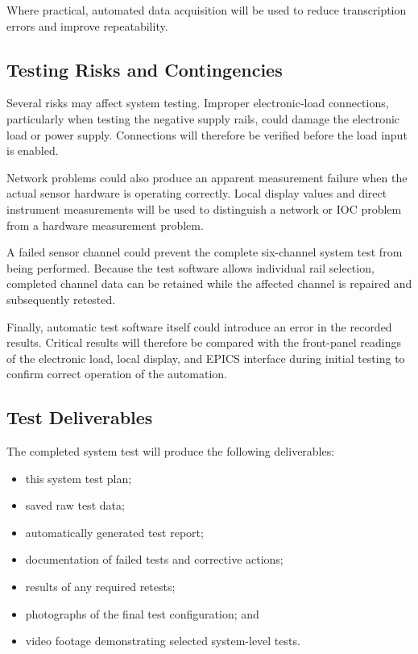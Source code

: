 Where practical, automated data acquisition will be used to reduce transcription
errors and improve repeatability.

\subsection{Testing Risks and Contingencies}

Several risks may affect system testing. Improper electronic-load connections,
particularly when testing the negative supply rails, could damage the electronic
load or power supply. Connections will therefore be verified before the load input
is enabled.

Network problems could also produce an apparent measurement failure when the actual
sensor hardware is operating correctly. Local display values and direct instrument
measurements will be used to distinguish a network or IOC problem from a hardware
measurement problem.

A failed sensor channel could prevent the complete six-channel system test from
being performed. Because the test software allows individual rail selection, completed
channel data can be retained while the affected channel is repaired and subsequently
retested.

Finally, automatic test software itself could introduce an error in the recorded
results. Critical results will therefore be compared with the front-panel readings
of the electronic load, local display, and EPICS interface during
initial testing to confirm correct operation of the automation.

\subsection{Test Deliverables}

The completed system test will produce the following deliverables:

\begin{itemize}
    \item this system test plan;
    \item saved raw test data;
    \item automatically generated test report;
    \item documentation of failed tests and corrective actions;
    \item results of any required retests;
    \item photographs of the final test configuration; and
    \item video footage demonstrating selected system-level tests.
\end{itemize}

